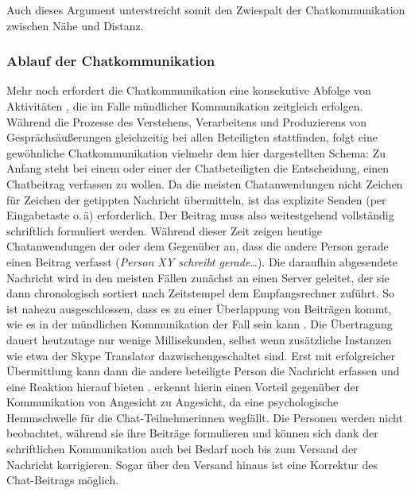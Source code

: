\noindent Auch dieses Argument unterstreicht somit den Zwiespalt der Chatkommunikation zwischen Nähe und Distanz.



\subsubsection{Ablauf der Chatkommunikation}\label{K2:para:Ablauf}
Mehr noch erfordert die Chatkommunikation eine \glqq konsekutive Abfolge von Aktivitäten\grqq{} \citep[145]{beiswenger_eyetracking_2017}, die im Falle mündlicher Kommunikation zeitgleich erfolgen. Während die Prozesse des Verstehens, Verarbeitens und Produzierens von Gesprächsäußerungen gleichzeitig bei allen Beteiligten stattfinden, folgt eine gewöhnliche Chatkommunikation vielmehr dem hier dargestellten Schema: Zu Anfang steht bei einem oder einer der Chatbeteiligten die Entscheidung, einen Chatbeitrag verfassen zu wollen. Da die meisten Chatanwendungen nicht Zeichen für Zeichen der getippten Nachricht übermitteln, ist das explizite Senden (per Eingabetaste o.\,ä) erforderlich. Der Beitrag muss also weitestgehend vollständig schriftlich formuliert werden. Während dieser Zeit zeigen heutige Chatanwendungen der oder dem Gegenüber an, dass die andere Person gerade einen Beitrag verfasst (\emph{Person XY schreibt gerade\dots}). Die daraufhin abgesendete Nachricht wird in den meisten Fällen zunächst an einen Server geleitet, der sie dann chronologisch sortiert nach Zeitstempel dem Empfangsrechner zuführt. So ist nahezu ausgeschlossen, dass es zu einer Überlappung von Beiträgen kommt, wie es in der mündlichen Kommunikation der Fall sein kann \citep[7]{storrer_sprachliche_2001}. Die Übertragung dauert heutzutage nur wenige Millisekunden, selbst wenn zusätzliche Instanzen wie etwa der Skype Translator dazwischengeschaltet sind. Erst mit erfolgreicher Übermittlung kann dann die andere beteiligte Person die Nachricht erfassen und eine Reaktion hierauf bieten \citep[145\psq]{beiswenger_eyetracking_2017}. \citet[35\psq]{durscheid_neue_2016} erkennt hierin einen Vorteil gegenüber der Kommunikation von Angesicht zu Angesicht, da eine psychologische Hemmschwelle für die Chat-Teilnehmer{\textperiodcentered}innen wegfällt. Die Personen werden nicht beobachtet, während sie ihre Beiträge formulieren und können sich dank der schriftlichen Kommunikation auch bei Bedarf noch bis zum Versand der Nachricht korrigieren. Sogar über den Versand hinaus ist eine Korrektur des Chat-Beitrags möglich.

